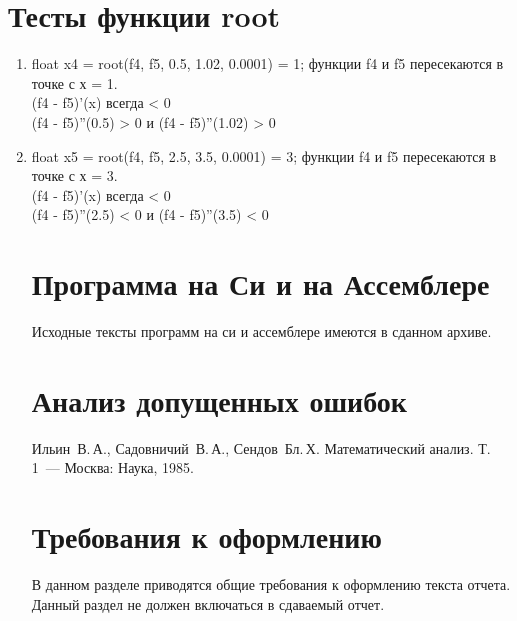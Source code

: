\documentclass[a4paper,12pt,titlepage,finall]{article}
\begin{document}
\section{Тесты функции root}
\begin{enumerate}
\item float x4 = root(f4, f5, 0.5, 1.02, 0.0001) = 1; функции f4 и f5 пересекаются в точке с х = 1.\\
(f4 - f5)'(x) всегда < 0\\
(f4 - f5)''(0.5) > 0 и (f4 - f5)''(1.02) > 0
\item float x5 = root(f4, f5, 2.5, 3.5, 0.0001) = 3; функции f4 и f5 пересекаются в точке с х = 3.\\
(f4 - f5)'(x) всегда < 0\\
(f4 - f5)''(2.5) < 0 и (f4 - f5)''(3.5) < 0
\newpage

\section{Программа на Си и на Ассемблере}
Исходные тексты программ на си и ассемблере имеются в сданном архиве.

\newpage

\section{Анализ допущенных ошибок}

\newpage
\begin{raggedright}
\begin{thebibliography}{99}
 Ильин~В.\,А., Садовничий~В.\,А., Сендов~Бл.\,Х. Математический анализ. Т.\,1~---
    Москва: Наука, 1985.
\end{thebibliography}
\end{raggedright}

\newpage

\section*{Требования к оформлению}

В данном разделе приводятся общие требования к оформлению текста отчета.
Данный раздел не должен включаться в сдаваемый отчет.


\end{enumerate}
\end{document}
